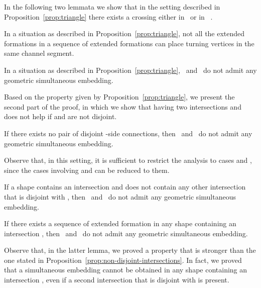 \documentclass[a4paper,10pt]{llncs}
\newcounter{prop}
\newcommand{\T}{\mbox{ }}
\renewcommand{\P}{\mbox{ }}
\begin{document}
In the following two lemmata we show that in the setting described in Proposition~\ref{prop:triangle} there exists a crossing either in \T or in \P.

\begin{lemma}
\label{lem:one_channel_segment}
In a situation as described in Proposition~\ref{prop:triangle}, not all the extended formations in a sequence of extended formations can place turning vertices in the same channel segment.
\end{lemma}

\begin{lemma}\label{lem:prop3-nodrawing}
In a situation as described in Proposition~\ref{prop:triangle}, \T and \P do not admit any geometric simultaneous embedding.
\end{lemma}

Based on the property given by Proposition~\ref{prop:triangle}, we present the second part of the proof, in which we show that having two intersections  and  does not help if  and  are not disjoint.

\begin{proposition}\label{prop:non-disjoint-intersections}
If there exists no pair of disjoint -side connections, then \T and \P do not admit any geometric simultaneous embedding.
\end{proposition}

Observe that, in this setting, it is sufficient to restrict the analysis to cases  and , since the cases involving  and  can be reduced to them.

\begin{lemma}\label{lem:intersects_one_three}
If a shape contains an intersection  and does not contain any other intersection that is disjoint with , then \T and \P do not admit any geometric simultaneous embedding.
\end{lemma}

\begin{lemma}\label{lem:intersects_three_one}
If there exists a sequence of extended formation in any shape containing an intersection , then \T and \P do not admit any geometric simultaneous embedding.
\end{lemma}

Observe that, in the latter lemma, we proved a property that is stronger than the one stated in Proposition~\ref{prop:non-disjoint-intersections}. In fact, we proved that a simultaneous embedding cannot be obtained in any shape containing an intersection , even if a second intersection that is disjoint with  is present.
\end{document}
